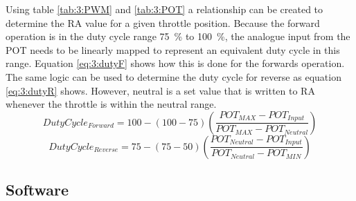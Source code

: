 		Using table \ref{tab:3:PWM} and \ref{tab:3:POT} a relationship can be created to determine the RA value for a given throttle position. Because the forward operation is in the duty cycle range \SI{75}{\percent} to \SI{100}{\percent}, the analogue input from the POT needs to be linearly mapped to represent an equivalent duty cycle in this range. Equation \ref{eq:3:dutyF} shows how this is done for the forwards operation. The same logic can be used to determine the duty cycle for reverse as equation \ref{eq:3:dutyR} shows. However, neutral is a set value that is written to RA whenever the throttle is within the neutral range.
		\begin{equation}
			Duty Cycle_{Forward} = 100 - (100-75)(\frac{POT_{MAX} - POT_{Input}}{POT_{MAX} - POT_{Neutral}})
			\label{eq:3:dutyF}
		\end{equation}
		\begin{equation}
			Duty Cycle_{Reverse} = 75 - (75-50)(\frac{POT_{Neutral} - POT_{Input}}{POT_{Neutral} - POT_{MIN}})
			\label{eq:3:dutyR}
		\end{equation}
	\subsection{Software}
